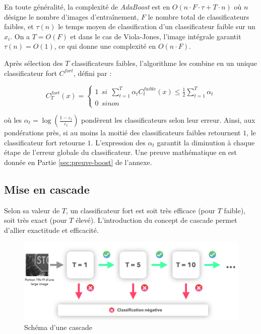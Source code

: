 \documentclass[12pt,a4paper]{article}
\begin{document}
En toute généralité, la complexité de \textit{AdaBoost} est en $O(n \cdot F \cdot \tau + T \cdot n)$ où $n$ désigne le nombre d'images d'entraînement, $F$ le nombre total de classificateurs faibles, et $\tau(n)$ le temps moyen de classification d'un classificateur faible sur un $x_i$. On a $T = O(F)$ et dans le cas de Viola-Jones, l'image intégrale garantit $\tau(n) = O(1)$, ce qui donne une complexité en $O(n \cdot F)$.

Après sélection des $T$ classificateurs faibles, l'algorithme les combine en un unique classificateur fort $C^{fort}$, défini par :

\begin{equation}
    C_T^{fort}(x) = 
    \begin{cases}
    1 \:\: si \:\: \sum_{t=1}^T \alpha_t C_t^{faible}(x) \leq \frac{1}{2} \sum_{t=1}^T \alpha_t \\
    0 \:\: sinon
    \end{cases}
\end{equation}

où les $\alpha_t = \log(\frac{1 - \varepsilon_t}{\varepsilon_t})$ pondèrent les classificateurs selon leur erreur. Ainsi, aux pondérations près, si au moins la moitié des classificateurs faibles retournent $1$, le classificateur fort retourne $1$. L'expression des $\alpha_t$ garantit la diminution à chaque étape de l'erreur globale du classificateur. Une preuve mathématique en est donnée en Partie \ref{sec:preuve-boost} de l'annexe.


\subsection{Mise en cascade}
Selon sa valeur de $T$, un classificateur fort est soit très efficace (pour $T$ faible), soit très exact (pour $T$ élevé). L'introduction du concept de cascade permet d'allier exactitude et efficacité. 

\begin{figure}[h]
    \includegraphics[scale = 0.4]{cascade}
    \centering
    \caption{Schéma d'une cascade}
\end{figure}
\end{document}
